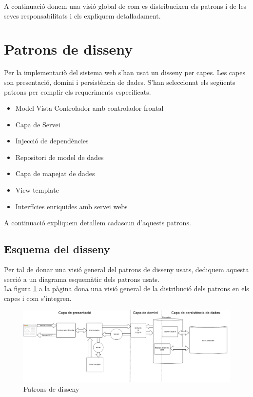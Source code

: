 A continuació donem una visió global de com es distribueixen els patrons i de les seves responsabilitats i els expliquem detalladament.

\section{Patrons de disseny}
Per la implementaci\`{o} del sistema web s'han usat un disseny per capes. Les capes son presentaci\'{o}, domini i persistència de dades. S'han seleccionat els següents patrons per complir els requeriments especificats.
  \begin{itemize}
  \item Model-Vista-Controlador amb controlador frontal
  \item Capa de Servei
  \item Injecci\'{o} de depend\`{e}ncies
  \item Repositori de model de dades
  \item Capa de mapejat de dades
  \item View template
  \item Interfícies enriquides amb servei webs
  \end{itemize}
A continuació expliquem detallem cadascun d'aquests patrons.

\subsection{Esquema del disseny}
Per tal de donar una visió general del patrons de disseny usats, dediquem aquesta secció a un diagrama esquemàtic dels patrons usats.\\

La figura \ref{fig:dessignpatters} a la p\`{a}gina \pageref{fig:dessignpatters} dona una visió general de la distribució dels patrons en els capes i com s'integren.\\
\begin{figure}
  \includegraphics[scale=0.4]{img/design/IchnaeaPatterns.png}
  \caption{Patrons de disseny}
  \label{fig:dessignpatters}
\end{figure}

